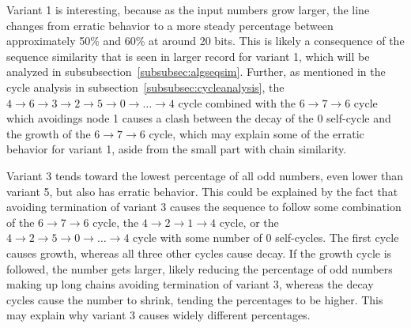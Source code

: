Variant 1 is interesting, because as the input numbers grow larger, the line changes from erratic behavior to a more steady percentage between approximately 50\% and 60\% at around 20 bits. This is likely a consequence of the sequence similarity that is seen in larger record for variant 1, which will be analyzed in subsubsection~\ref{subsubsec:algseqsim}. Further, as mentioned in the cycle analysis in subsection~\ref{subsubsec:cycleanalysis}, the $4 \rightarrow 6 \rightarrow 3 \rightarrow 2 \rightarrow 5 \rightarrow 0 \rightarrow \ldots \rightarrow 4$ cycle combined with the  $6 \rightarrow 7 \rightarrow 6$ cycle which avoidings node 1 causes a clash between the decay of the 0 self-cycle and the growth of the $6 \rightarrow 7 \rightarrow 6$ cycle, which may explain some of the erratic behavior for variant 1, aside from the small part with chain similarity. \par
Variant 3 tends toward the lowest percentage of all odd numbers, even lower than variant 5, but also has erratic behavior. This could be explained by the fact that avoiding termination of variant 3 causes the sequence to follow some combination of the $6 \rightarrow 7 \rightarrow 6$ cycle, the $4 \rightarrow 2 \rightarrow 1 \rightarrow 4$ cycle, or the $4 \rightarrow 2 \rightarrow 5 \rightarrow 0  \rightarrow \ldots \rightarrow 4$ cycle with some number of $0$ self-cycles. The first cycle causes growth, whereas all three other cycles cause decay. If the growth cycle is followed, the number gets larger, likely reducing the percentage of odd numbers making up long chains avoiding termination of variant 3, whereas the decay cycles cause the number to shrink, tending the percentages to be higher. This may explain why variant 3 causes widely different percentages.
